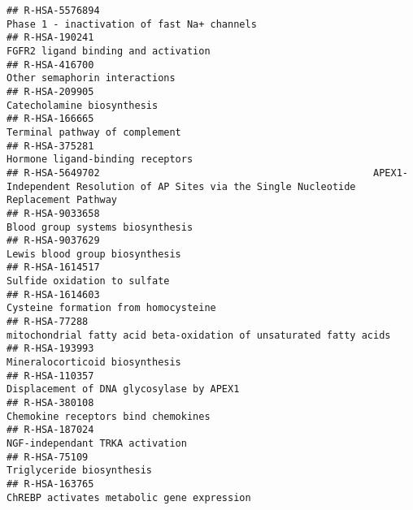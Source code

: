 \documentclass[
]{article}
\begin{document}
\begin{verbatim}
## R-HSA-5576894                                                                                          Phase 1 - inactivation of fast Na+ channels
## R-HSA-190241                                                                                                   FGFR2 ligand binding and activation
## R-HSA-416700                                                                                                         Other semaphorin interactions
## R-HSA-209905                                                                                                            Catecholamine biosynthesis
## R-HSA-166665                                                                                                        Terminal pathway of complement
## R-HSA-375281                                                                                                      Hormone ligand-binding receptors
## R-HSA-5649702                                               APEX1-Independent Resolution of AP Sites via the Single Nucleotide Replacement Pathway
## R-HSA-9033658                                                                                                     Blood group systems biosynthesis
## R-HSA-9037629                                                                                                       Lewis blood group biosynthesis
## R-HSA-1614517                                                                                                         Sulfide oxidation to sulfate
## R-HSA-1614603                                                                                                 Cysteine formation from homocysteine
## R-HSA-77288                                                                     mitochondrial fatty acid beta-oxidation of unsaturated fatty acids
## R-HSA-193993                                                                                                        Mineralocorticoid biosynthesis
## R-HSA-110357                                                                                              Displacement of DNA glycosylase by APEX1
## R-HSA-380108                                                                                                   Chemokine receptors bind chemokines
## R-HSA-187024                                                                                                       NGF-independant TRKA activation
## R-HSA-75109                                                                                                              Triglyceride biosynthesis
## R-HSA-163765                                                                                            ChREBP activates metabolic gene expression

\end{verbatim}
\end{document}
